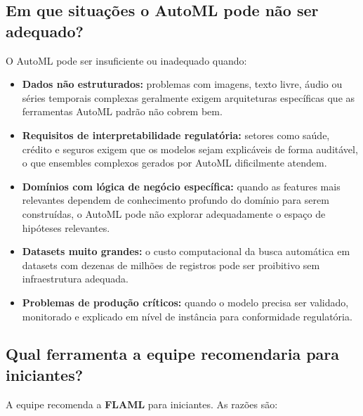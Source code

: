 \documentclass[11pt, a4paper, oneside]{article}
\begin{document}
\subsection{Em que situações o AutoML pode não ser adequado?}
\label{sec:nao-adequado}

O AutoML pode ser insuficiente ou inadequado quando:

\begin{itemize}[leftmargin=1.5cm, itemsep=4pt]
  \item \textbf{Dados não estruturados:} problemas com imagens, texto livre, áudio ou séries temporais complexas geralmente exigem arquiteturas específicas que as ferramentas AutoML padrão não cobrem bem.
  \item \textbf{Requisitos de interpretabilidade regulatória:} setores como saúde, crédito e seguros exigem que os modelos sejam explicáveis de forma auditável, o que ensembles complexos gerados por AutoML dificilmente atendem.
  \item \textbf{Domínios com lógica de negócio específica:} quando as features mais relevantes dependem de conhecimento profundo do domínio para serem construídas, o AutoML pode não explorar adequadamente o espaço de hipóteses relevantes.
  \item \textbf{Datasets muito grandes:} o custo computacional da busca automática em datasets com dezenas de milhões de registros pode ser proibitivo sem infraestrutura adequada.
  \item \textbf{Problemas de produção críticos:} quando o modelo precisa ser validado, monitorado e explicado em nível de instância para conformidade regulatória.
\end{itemize}

\subsection{Qual ferramenta a equipe recomendaria para iniciantes?}
\label{sec:recomendacao}

A equipe recomenda a \textbf{FLAML} para iniciantes. As razões são:
\end{document}
